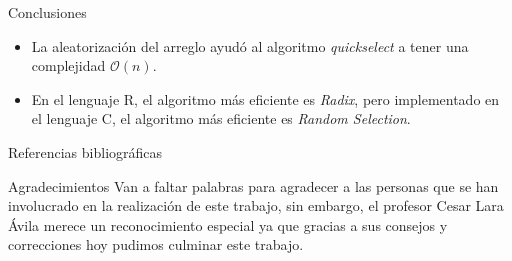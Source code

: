 \documentclass[final]{beamer}
\newlength{\onecolwid}
\begin{document}
\begin{frame}[t]
\begin{columns}[t]
\begin{column}{\onecolwid}
			\vspace{-0.5cm}

			\begin{block}{Conclusiones}
				\begin{itemize}
					\item La aleatorización del arreglo ayudó al algoritmo \emph{quickselect} a tener una complejidad $\mathcal{O}(n)$.

					\item En el lenguaje R, el algoritmo más eficiente es \emph{Radix}, pero implementado en el lenguaje C, el algoritmo más eficiente es \emph{Random Selection}.
				\end{itemize}
			\end{block}

			\begin{block}{Referencias bibliográficas}
				\vspace{-0.5cm}
				\nocite{*} %
				
			\end{block}

			\begin{block}{\large Agradecimientos}
				Van a faltar palabras para agradecer a las personas que se han involucrado en la realización de este trabajo, sin embargo, el profesor Cesar Lara Ávila merece un reconocimiento especial ya que gracias a sus consejos y correcciones hoy pudimos culminar este trabajo.
      \end{block}


\end{column}
\end{columns}
\end{frame}
\end{document}
